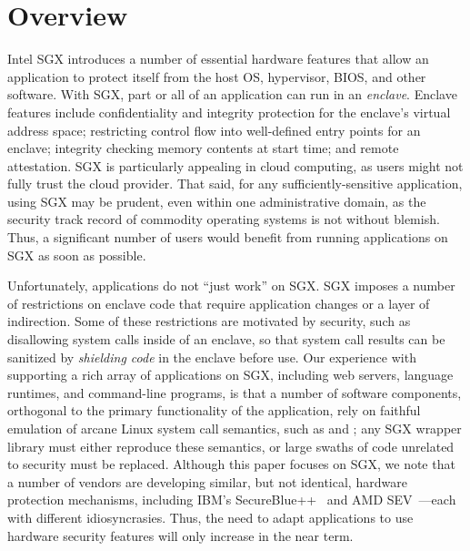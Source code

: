 \section{\graphenesgx{} Overview}

Intel SGX introduces a number of essential hardware features that allow an application
to protect itself from the host OS, hypervisor, BIOS, and other software.
With SGX, part or all of an application can run in an {\em enclave}.
Enclave features include confidentiality and integrity protection
for the enclave's virtual address space;
restricting control flow into well-defined entry points for an enclave;
integrity checking memory contents at start time;
and remote attestation.
SGX is particularly appealing in cloud computing, as users 
might not fully trust the cloud provider.
That said, for any sufficiently-sensitive application, using SGX may be prudent,
even within one administrative domain,
as the security track record of commodity operating systems is not without blemish.
Thus, a significant number of users would benefit from running applications on SGX as soon as possible.

Unfortunately, applications do not ``just work'' on SGX.
SGX imposes a number of restrictions on enclave code 
that require application changes
or a layer of indirection. %
Some of these restrictions are motivated by security, such as disallowing system calls
inside of an enclave, so that system call results can be sanitized by {\em shielding code} in the enclave before use.
Our experience with supporting a rich array of applications on SGX, including web servers, language runtimes, and
command-line programs,
is that
a number of software components,
orthogonal to the primary functionality of the application,
rely on faithful emulation of arcane Linux system call semantics, such as  and ;
any SGX wrapper library must either reproduce these semantics, or large swaths of code unrelated to security
must be replaced.
Although this paper focuses on SGX, we note that a number of vendors are developing similar, but not identical,
hardware protection mechanisms, including IBM's SecureBlue++~\cite{secureblue++} and AMD SEV~\cite{amd-sme}---each
with different idiosyncrasies.
Thus, the need to adapt applications to use hardware security features
will only increase in the near term.

